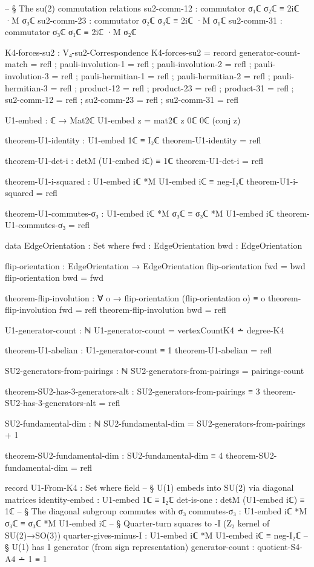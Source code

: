 \documentclass[11pt,a4paper]{book}
\begin{document}
\begin{code}
    -- § The su(2) commutation relations
    su2-comm-12 : commutator σ₁ℂ σ₂ℂ ≡ 2iℂ ·M σ₃ℂ
    su2-comm-23 : commutator σ₂ℂ σ₃ℂ ≡ 2iℂ ·M σ₁ℂ
    su2-comm-31 : commutator σ₃ℂ σ₁ℂ ≡ 2iℂ ·M σ₂ℂ

K4-forces-su2 : V₄-su2-Correspondence
K4-forces-su2 = record
  { generator-count-match = refl
  ; pauli-involution-1    = refl
  ; pauli-involution-2    = refl
  ; pauli-involution-3    = refl
  ; pauli-hermitian-1     = refl
  ; pauli-hermitian-2     = refl
  ; pauli-hermitian-3     = refl
  ; product-12            = refl
  ; product-23            = refl
  ; product-31            = refl
  ; su2-comm-12           = refl
  ; su2-comm-23           = refl
  ; su2-comm-31           = refl
  }

U1-embed : ℂ → Mat2ℂ
U1-embed z = mat2ℂ z 0ℂ 0ℂ (conj z)

theorem-U1-identity : U1-embed 1ℂ ≡ I₂ℂ
theorem-U1-identity = refl

theorem-U1-det-i : detM (U1-embed iℂ) ≡ 1ℂ
theorem-U1-det-i = refl

theorem-U1-i-squared : U1-embed iℂ *M U1-embed iℂ ≡ neg-I₂ℂ
theorem-U1-i-squared = refl

theorem-U1-commutes-σ₃ : U1-embed iℂ *M σ₃ℂ ≡ σ₃ℂ *M U1-embed iℂ
theorem-U1-commutes-σ₃ = refl

data EdgeOrientation : Set where
  fwd  : EdgeOrientation
  bwd : EdgeOrientation

flip-orientation : EdgeOrientation → EdgeOrientation
flip-orientation fwd  = bwd
flip-orientation bwd = fwd

theorem-flip-involution : ∀ o → flip-orientation (flip-orientation o) ≡ o
theorem-flip-involution fwd  = refl
theorem-flip-involution bwd = refl

U1-generator-count : ℕ
U1-generator-count = vertexCountK4 ∸ degree-K4

theorem-U1-abelian : U1-generator-count ≡ 1
theorem-U1-abelian = refl

SU2-generators-from-pairings : ℕ
SU2-generators-from-pairings = pairings-count

theorem-SU2-has-3-generators-alt : SU2-generators-from-pairings ≡ 3
theorem-SU2-has-3-generators-alt = refl

SU2-fundamental-dim : ℕ
SU2-fundamental-dim = SU2-generators-from-pairings + 1

theorem-SU2-fundamental-dim : SU2-fundamental-dim ≡ 4
theorem-SU2-fundamental-dim = refl

record U1-From-K4 : Set where
  field
    -- § U(1) embeds into SU(2) via diagonal matrices
    identity-embed : U1-embed 1ℂ ≡ I₂ℂ
    det-is-one     : detM (U1-embed iℂ) ≡ 1ℂ
    -- § The diagonal subgroup commutes with σ₃
    commutes-σ₃    : U1-embed iℂ *M σ₃ℂ ≡ σ₃ℂ *M U1-embed iℂ
    -- § Quarter-turn squares to -I (Z₂ kernel of SU(2)→SO(3))
    quarter-gives-minus-I : U1-embed iℂ *M U1-embed iℂ ≡ neg-I₂ℂ
    -- § U(1) has 1 generator (from sign representation)
    generator-count : quotient-S4-A4 ∸ 1 ≡ 1


\end{code}
\end{document}
